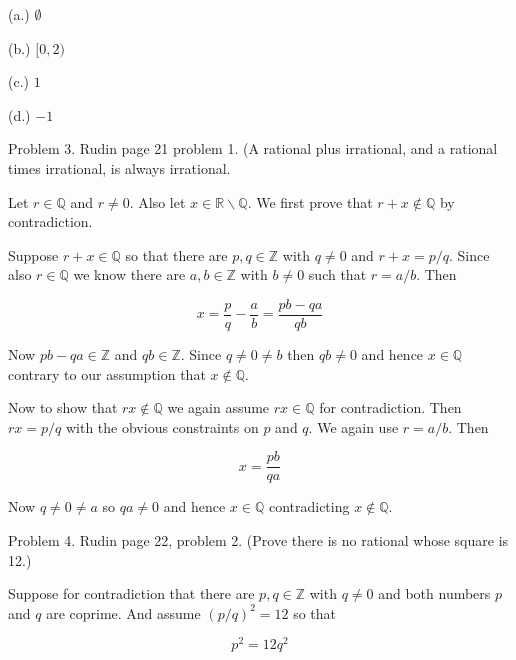 \documentclass{article}
\begin{document}
(a.) $\emptyset$

\vspace{1cm}

(b.) $[0,2)$

\vspace{1cm}

(c.) $1$

\vspace{1cm}

(d.) $-1$

\pagebreak

{\Large \color{Sepia} Problem 3. Rudin page 21 problem 1.  (A rational plus irrational, and a rational times irrational, is always irrational.}

\vspace{1cm}

Let $r\in \mathbb Q$ and $r\ne 0$.  Also let $x\in \mathbb R\smallsetminus \mathbb Q$.  We first prove that $r+x\not\in \mathbb Q$ by contradiction.

Suppose $r+x\in \mathbb Q$ so that there are $p,q\in \mathbb Z$ with $q\ne 0$ and $r+x = p/q$.  Since also $r\in \mathbb Q$ we know there are $a,b\in \mathbb Z$ with $b\ne 0$ such that $r = a/b$.  Then

$$ x = \frac p q - \frac a b = \frac{pb-qa}{qb} $$

Now $pb-qa\in \mathbb Z$ and $qb\in\mathbb Z$.  Since $q\ne 0\ne b$ then $qb\ne 0$ and hence $x\in \mathbb Q$ contrary to our assumption that $x\not\in \mathbb Q$.  \Lightning

\vspace{1cm}

Now to show that $rx\not\in \mathbb Q$ we again assume $rx\in\mathbb Q$ for contradiction.  Then $rx = p/q$ with the obvious constraints on $p$ and $q$.  We again use $r=a/b$.  Then

$$ x = \frac{pb}{qa} $$

Now $q\ne 0\ne a$ so $qa\ne 0$ and hence $x\in \mathbb Q$ contradicting $x\not\in\mathbb Q$.  \Lightning

\pagebreak

{\Large \color{Sepia} Problem 4. Rudin page 22, problem 2.  (Prove there is no rational whose square is 12.)}

\vspace{1cm}

Suppose for contradiction that there are $p,q\in \mathbb Z$ with $q\ne 0$ and both numbers $p$ and $q$ are coprime. And assume $(p/q)^2 = 12$ so that

$$ p^2 = 12q^2 $$
\end{document}
